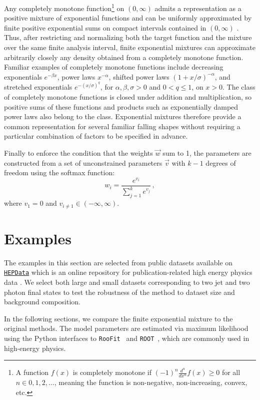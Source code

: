 \documentclass[a4paper,11pt]{article}
\begin{document}
Any completely monotone function\footnote{\label{cm_def}A function $f(x)$ is completely monotone if $(-1)^n \frac{d^n}{dx^n}f(x) \geq 0$ for all $n \in {0,1,2,\ldots}$, meaning the function is non-negative, non-increasing, convex, etc.} on $(0,\infty)$ admits a representation as a positive mixture of exponential functions \cite{bernstein} and can be uniformly approximated by finite positive exponential sums on compact intervals contained in $(0,\infty)$ \cite{McGlinn_1978}. Thus, after restricting and normalizing both the target function and the mixture over the same finite analysis interval, finite exponential mixtures can approximate arbitrarily closely any density obtained from a completely monotone function. Familiar examples of completely monotone functions include decreasing exponentials $e^{-\beta x}$, power laws $x^{-\alpha}$, shifted power laws $(1+x/\sigma)^{-\alpha}$, and stretched exponentials $e^{-(x/\sigma)^q}$, for $\alpha,\beta,\sigma>0$ and $0<q\leq1$, on $x>0$. The class of completely monotone functions is closed under addition and multiplication, so positive sums of these functions and products such as exponentially damped power laws also belong to the class. Exponential mixtures therefore provide a common representation for several familiar falling shapes without requiring a particular combination of factors to be specified in advance.

Finally to enforce the condition that the weights $\vec{w}$ sum to 1, the parameters are 
constructed from a set of unconstrained parameters $\vec{v}$ with $k-1$ degrees of freedom 
using the softmax function:
\begin{equation}
\label{softmax}
w_i = \frac{e^{v_i}}{\sum_{j=1}^{k}e^{v_j}} \, ,
\end{equation}
where $v_1=0$ and $v_{i\neq 1} \in (-\infty,\infty)$.

\section{Examples} \label{sec:examples}

The examples in this section are selected from public datasets available on \href{https://www.hepdata.net/}{\texttt{HEPData}} which is an online repository for publication-related high energy physics data \cite{Maguire_2017}. We select both large and small datasets corresponding to two jet and two photon final states to test the robustness of the method to dataset size and background composition.

In the following sections, we compare the finite exponential mixture to the original methods. The model parameters are estimated via maximum likelihood using the Python interfaces to \texttt{RooFit}~\cite{RooFit} and \texttt{ROOT}~\cite{ROOT}, which are commonly used in high-energy physics.
\end{document}

